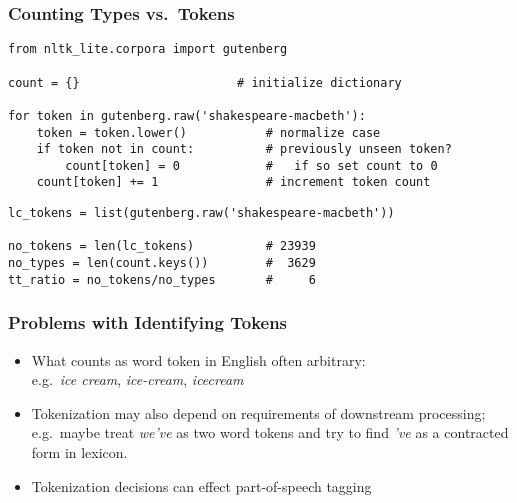 \begin{frame}[fragile]
  \frametitle{Counting Types vs.\ Tokens}
{\small
\begin{verbatim}
from nltk_lite.corpora import gutenberg

count = {}                      # initialize dictionary

for token in gutenberg.raw('shakespeare-macbeth'):    
    token = token.lower()           # normalize case
    if token not in count:          # previously unseen token?
        count[token] = 0            #   if so set count to 0
    count[token] += 1               # increment token count
\end{verbatim}

\pause
\begin{verbatim}
lc_tokens = list(gutenberg.raw('shakespeare-macbeth'))

no_tokens = len(lc_tokens)          # 23939
no_types = len(count.keys())        #  3629
tt_ratio = no_tokens/no_types       #     6
\end{verbatim}
}
\end{frame}

\begin{frame}[fragile]
  \frametitle{Problems with Identifying Tokens}

  \begin{itemize}[<+->]
  \item<1-> What counts as word token in English often arbitrary: \\
    e.g.\ \textit{ice cream},     \textit{ice-cream},     \textit{icecream}
  \item<2-> Tokenization may also depend on requirements of downstream
    processing; e.g.\ maybe treat \textit{we've} as two word
    tokens and try to find \textit{'ve} as a contracted form in lexicon.
  \item<3-> Tokenization decisions can effect part-of-speech tagging

  \end{itemize}

\end{frame}

